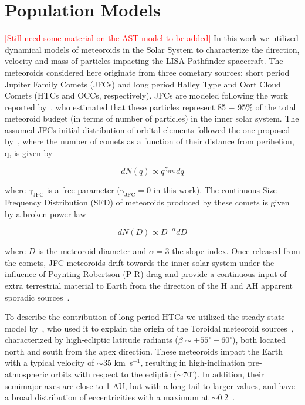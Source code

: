 \documentclass[twocolumn, trackchanges]{aastex62}
\newcommand{\red}[1]{\textcolor{red}{#1}}
\begin{document}
\section{Population Models}\label{sec:models}
\red{[Still need some material on the AST model to be added]}
In this work we utilized dynamical models of meteoroids in the Solar System to characterize the direction, velocity and mass of particles impacting the LISA Pathfinder spacecraft.
The meteoroids considered here originate from three cometary sources: short period Jupiter Family Comets (JFCs) and long period Halley Type and Oort Cloud Comets (HTCs and OCCs, respectively). JFCs are modeled following the work  reported by~\cite{Nesvorny10,Nesvorny11a}, who estimated that these particles represent 85 $-$ 95\% of the total meteoroid budget (in terms of number of particles) in the inner solar system. The assumed JFCs initial distribution of orbital elements followed the one proposed by~\cite{LevisonDuncan97}, where the number of comets as a function of their distance from perihelion, q, is given by

\begin{equation}
dN(q)\propto q^{\gamma_\mathrm{JFC}} dq\label{nq}
\end{equation}

\noindent where $\gamma_\mathrm{JFC}$ is a free parameter ($\gamma_\mathrm{JFC} = 0$ in this work). The continuous Size Frequency Distribution (SFD) of meteoroids produced by these comets is given by a broken power-law

\begin{equation}
dN(D)\propto D^{-\alpha}dD\label{nd}
\end{equation}

\noindent where $D$ is the meteoroid diameter and $\alpha=3$ the slope index. Once released from the comets, JFC meteoroids drift towards the inner solar system under the influence of Poynting-Robertson (P-R) drag and provide a continuous input of extra terrestrial material to Earth from the direction of the H and AH apparent sporadic sources~\cite[][]{JonesBrown93,Nesvorny10}.

To describe the contribution of long period HTCs we utilized the steady-state model by~\cite{Pokorny14}, who used it to explain the origin of the Toroidal meteoroid sources~\cite[][]{JonesBrown93,CampbellBrown09,Janches15}, characterized by high-ecliptic latitude radiants ($\beta\sim\pm 55^{\circ} - 60^{\circ}$), both located north and south from the apex direction. These meteoroids impact the Earth with a typical velocity of $\sim$35 km~s$^{-1}$, resulting in high-inclination pre-atmospheric orbits with respect to the ecliptic ($\sim70^{\circ}$). In addition, their semimajor axes are close to 1 AU, but with a long tail to larger values, and have a broad distribution of eccentricities with a maximum at $\sim$0.2~\cite[See Figure 13 in][]{Janches15}. 
\end{document}

